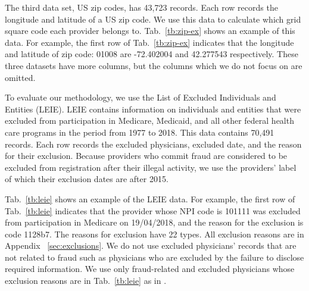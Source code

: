 \documentclass[dvipdfmx, english]{ampmt}             %
\newcommand{\Tabref}[1]{Tab.~\ref{#1}}
\newcommand{\Appref}[1]{Appendix ~\ref{#1}}
\begin{document}
The third data set, US zip codes, has 43,723 records. Each row records the longitude and latitude of a US zip code. We use this data to calculate which grid square code\cite{ASatoMesh} each provider belongs to.
\Tabref{tb:zip-ex} shows an 
example of this data. For example, the first row of \Tabref{tb:zip-ex} indicates that the longitude and latitude of zip code: 01008 are -72.402004 and 42.277543 respectively. These three datasets have more columns, but the columns which we do not focus on are omitted.
\par

To evaluate our methodology, we use the List of Excluded Individuals and Entities (LEIE). LEIE contains information on individuals and entities that were excluded from participation in Medicare, Medicaid, and all other federal health care programs in the period from 1977 to 2018\cite{Leie}. This data contains 70,491 records. Each row records the excluded physicians, excluded date, and the reason for their exclusion. Because providers who commit fraud are considered to be excluded from registration after their illegal activity, we use 
the providers' label of which their exclusion dates are after 2015.

\Tabref{tb:leie} shows an example of the LEIE data. For example, the first row of \Tabref{tb:leie} indicates that the provider whose NPI code is 101111 was excluded from participation in Medicare on 19/04/2018, and the reason for the exclusion is code 1128b7. 
The reasons for exclusion have 22 types. All exclusion reasons are in \Appref{sec:exclusions}. We do not use excluded physicians' records that are not related to fraud such as physicians who are excluded by the failure to disclose required information.
We use only fraud-related and excluded physicians whose exclusion reasons are in \Tabref{tb:leie} as in \cite{TwoModels}. 
\end{document}
